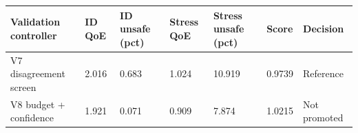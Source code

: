 \begin{tabular}{lllllll}
\toprule
Validation controller & ID QoE & ID unsafe (pct) & Stress QoE & Stress unsafe (pct) & Score & Decision \\
\midrule
V7 disagreement screen & 2.016 & 0.683 & 1.024 & 10.919 & 0.9739 & Reference \\
V8 budget + confidence & 1.921 & 0.071 & 0.909 & 7.874 & 1.0215 & Not promoted \\
\bottomrule
\end{tabular}
